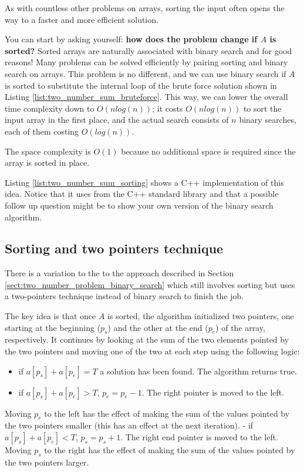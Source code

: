 As with countless other problems on arrays, sorting the input often opens the
way to a faster and more efficient solution. 

You can start by asking yourself: \textbf{how does the problem change if  $A$ is sorted?}
Sorted arrays are naturally associated with binary search and for good reasons! Many problems can be solved efficiently by pairing sorting and binary search on arrays. 
This problem is no different, and we can use binary search if $A$ is sorted to substitute the internal loop of the brute force solution shown in Listing \ref{list:two_number_sum_bruteforce}. This way, we can  lower the overall time complexity down to $O(n log(n))$; it costs
$O(n log(n))$ to sort the input array in the first place, and the actual search consists of $n$ binary searches, each of them costing $O(log(n))$. 

The space complexity is $O(1)$ because no additional space is
required since the array is sorted in place.


Listing \ref{list:two_number_sum_sorting} shows a C++ implementation of this idea. Notice that it uses  from the C++ standard library and that a possible follow up question might be to show your own version of the binary search algorithm.






\subsection{Sorting and two pointers technique}
\label{sec:two_numbers:twopointers}


There is a variation to the  to the approach described in Section
\ref{sect:two_number_problem_binary_search} which still involves sorting but uses a two-pointers
technique instead of binary search to finish the job. 

The key idea is that once $A$ is sorted, the algorithm initialized
two pointers, one starting at the beginning ($p_s$) and the other at the end ($p_e$) of the array, respectively.
It continues by looking at the sum of the two elements pointed by the two pointers and moving one of
the two at each step using the following logic: 
\begin{itemize}
	\item if $a[p_s]+a[p_e] = T$ a solution has been found. The algorithm returns true.
	\item if $a[p_s]+a[p_e] > T$, $p_e=p_e-1$. The right pointer is moved to the left. 
\end{itemize}
Moving	$p_e$ to the left has the effect of making the sum of the values pointed by the two pointers smaller (this has an effect at the next iteration). 
- if $a[p_s]+a[p_e] < T$, $p_s=p_s+1$. The right end pointer is moved to the left. Moving $p_s$ to the right has the effect of making the sum of the values pointed by the two pointers larger. 




